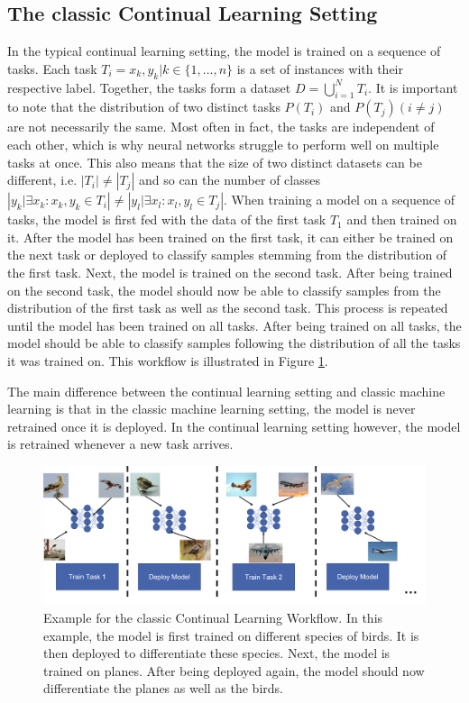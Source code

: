 \subsection{The classic Continual Learning Setting}
\label{sec:Methodology:CLSetting}
In the typical continual learning setting, the model is trained on a sequence of tasks. Each task $T_i = {x_k,y_k | k \in \{1,\ldots,n\}}$ is a set
of instances with their respective label. Together, the tasks form a dataset $D = \bigcup\limits_{i=1}^{N} T_i$. It is important to note that
the distribution of two distinct tasks $P(T_i)$  and $P(T_j) (i \neq j)$ are not necessarily the same. Most often in fact, the tasks are independent
of each other, which is why neural networks struggle to perform well on multiple tasks at once. This also means that the size of two distinct datasets
can be different, i.e. $|T_i| \neq |T_j|$ and so can the number of classes $|{y_k | \exists x_k: x_k,y_k \in T_i}| \neq |{y_l | \exists x_l: x_l,y_l
\in T_j}|$. When training a model on a sequence of tasks, the model is first fed with the data of the first task $T_1$ and then trained on it. 
After the model has been trained on the first task, it can either be trained on the next task or deployed to classify samples stemming from the
distribution of the first task. Next, the model is trained on the second task. After being trained on the second task, the model should now be able to
classify samples from the distribution of the first task as well as the second task. This process is repeated until the model has been trained on all
tasks. After being trained on all tasks, the model should be able to classify samples following the distribution of all the tasks it was trained on.
This workflow is illustrated in Figure \ref{fig:CLWorkflow}. \par
The main difference between the continual learning setting and classic machine learning is that in the classic machine learning setting, the model is never retrained
once it is deployed. In the continual learning setting however, the model is retrained whenever a new task arrives.

\begin{figure}[ht]
    \centering
    \includegraphics[width=.9\linewidth]{images/CL_workflow.png}
    \caption[Continual Learning Workflow]{Example for the classic Continual Learning Workflow. In this example, the model is first trained on different species of
    birds. It is then deployed to differentiate these species. Next, the model is trained on planes. After being deployed again, the model should now differentiate
    the planes as well as the birds.}
    \label{fig:CLWorkflow}
  \end{figure}

